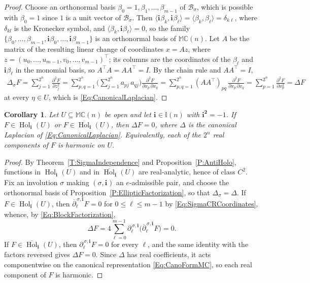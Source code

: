 \documentclass[12pt]{amsart}
\theoremstyle{plain}
\newtheorem{corollary}[theorem]{Corollary}
\theoremstyle{definition}
\numberwithin{equation}{section}
\newcommand{\im}[1]{\mathbf{ i_{#1}}}
\newcommand{\ims}[1]{\mathbf{ i_{#1}^2}}
\newcommand{\mC}{\mathbb{C}}
\newcommand{\mM}{\mathbb{M}}
\newcommand{\mI}{\mathbb{I}}
\newcommand{\cB}{\mathcal{B}}
\DeclareMathOperator{\hol}{Hol}
\begin{document}
\begin{proof}
    Choose an orthonormal basis $\beta_0 = 1 , \beta_1 , \ldots , \beta_{m - 1}$ of $\cB_\sigma$, which is possible with $\beta_0 = 1$ since $1$ is a unit vector of $\cB_\sigma$. Then $\langle \im{} \beta_k , \im{} \beta_\ell \rangle = \langle \beta_k , \beta_\ell \rangle = \delta_{k \ell}$, where $\delta_{kl}$ is the Kronecker symbol, and $\langle \beta_k , \im{} \beta_\ell \rangle = 0$, so the family $\{ \beta_0 , \ldots , \beta_{m - 1} , \im{} \beta_0 , \ldots , \im{} \beta_{m - 1} \}$ is an orthonormal basis of $\mM \mC(n)$. Let $A$ be the matrix of the resulting linear change of coordinates $x = A z$, where $z = ( u_0 , \ldots , u_{m-1} , v_0 , \ldots , v_{m-1} )^\top$; its columns are the coordinates of the $\beta_\ell$ and $\im{} \beta_\ell$ in the monomial basis, so $A^\top A = A A^\top = I$. By the chain rule and $A A^\top = I$,     
    \begin{align*}
    \Delta_\sigma F = \sum_{j = 1}^{2^n} \frac{\partial^2 F}{\partial z_j^2}
    = \sum_{p , q = 1}^{2^n} \Big( \sum_{j = 1}^{2^n} a_{pj}\, a_{qj} \Big) \frac{\partial^2 F}{\partial x_p\, \partial x_q}
    = \sum_{p , q = 1}^{2^n} (A A^\top)_{pq}\, \frac{\partial^2 F}{\partial x_p\, \partial x_q}
    = \sum_{p = 1}^{2^n} \frac{\partial^2 F}{\partial x_p^2} = \Delta F
    \end{align*}
    at every $\eta \in U$, which is \eqref{Eq:CanonicalLaplacian}. %
    \end{proof}

    \begin{corollary}\label{C:HolHarmonic}
    Let $U \subseteq \mM \mC(n)$ be open and let $\im{} \in \mI(n)$ with $\ims{} = -1$. If $F \in \hol_{\im{}} (U)$ or $F \in \overline{\hol}_{\im{}} (U)$, then $\Delta F = 0$, where $\Delta$ is the canonical Laplacian of \eqref{Eq:CanonicalLaplacian}. Equivalently, each of the $2^n$ real components of $F$ is harmonic on $U$.
    \end{corollary}

    \begin{proof}
    By Theorem~\ref{T:SigmaIndependence} and Proposition~\ref{P:AntiHolo}, functions in $\hol_{\im{}} (U)$ and in $\overline{\hol}_{\im{}} (U)$ are real-analytic, hence of class $C^2$. Fix an involution $\sigma$ making $(\sigma , \im{})$ an $e$-admissible pair, and choose the orthonormal basis of Proposition~\ref{P:EllipticFactorization}, so that $\Delta_\sigma = \Delta$. If $F \in \hol_{\im{}} (U)$, then $\overline{\partial}_\ell^{\, \sigma , \im{}} F = 0$ for $0 \leq \ell \leq m - 1$ by \eqref{Eq:SigmaCRCoordinates}, whence, by \eqref{Eq:BlockFactorization},
    \[
    \Delta F = 4 \sum_{\ell = 0}^{m - 1} \partial_\ell^{\, \sigma , \im{}} \big( \overline{\partial}_\ell^{\, \sigma , \im{}} F \big) = 0 .
    \]
    If $F \in \overline{\hol}_{\im{}} (U)$, then $\partial_\ell^{\, \sigma , \im{}} F = 0$ for every $\ell$, and the same identity with the factors reversed gives $\Delta F = 0$. Since $\Delta$ has real coefficients, it acts componentwise on the canonical representation \eqref{Eq:CanoFormMC}, so each real component of $F$ is harmonic.
    \end{proof}
\end{document}
